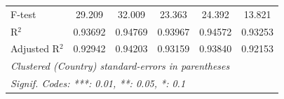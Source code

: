 \begin{table}[H]
\begin{tabular}{lccccc}
      F-test                                         & 29.209                               & 32.009                                       & 23.363                      & 24.392         & 13.821\\  
      R$^2$                                          & 0.93692                              & 0.94769                                      & 0.93967                     & 0.94572        & 0.93253\\  
      Adjusted R$^2$                                 & 0.92942                              & 0.94203                                      & 0.93159                     & 0.93840        & 0.92153\\  
      \midrule \midrule
      \multicolumn{6}{l}{\emph{Clustered (Country) standard-errors in parentheses}}\\
      \multicolumn{6}{l}{\emph{Signif. Codes: ***: 0.01, **: 0.05, *: 0.1}}\\
   \end{tabular}
\end{table}


